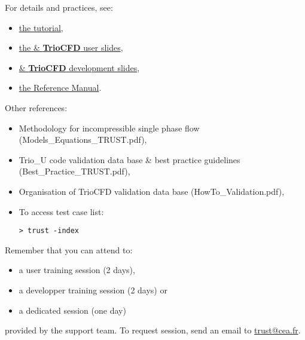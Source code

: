 For details and practices, see:
\begin{itemize}
\item \href{TRUST_tutorial.pdf}{the \trust tutorial},
\item \href{TRUST_and_TrioCFD_presentation.pdf}{the \trust \& \textbf{TrioCFD} user slides},
\item \href{Developer\_TRUST\_presentation.pdf}{\trust \& \textbf{TrioCFD} development slides},
\item \href{\REFERENCEMANUAL}{the \trustref Reference Manual}.
\end{itemize}

Other references:
\begin{itemize}
\item Methodology for incompressible single phase flow (Models\_Equations\_TRUST.pdf),
\item Trio\_U code validation data base \& best practice guidelines (Best\_Practice\_TRUST.pdf),
\item Organisation of TrioCFD validation data base (HowTo\_Validation.pdf),
\item To access \trust test case list:
\begin{verbatim}
> trust -index
\end{verbatim}
\end{itemize}
\vspace{0.5cm}


Remember that you can attend to:
\begin{itemize}
\item a user training session (2 days),
\item a developper training session (2 days) or 
\item a dedicated session (one day)
\end{itemize}
provided by the support team.
To request session, send an email to \href{mailto:trust@cea.fr}{trust@cea.fr}.

